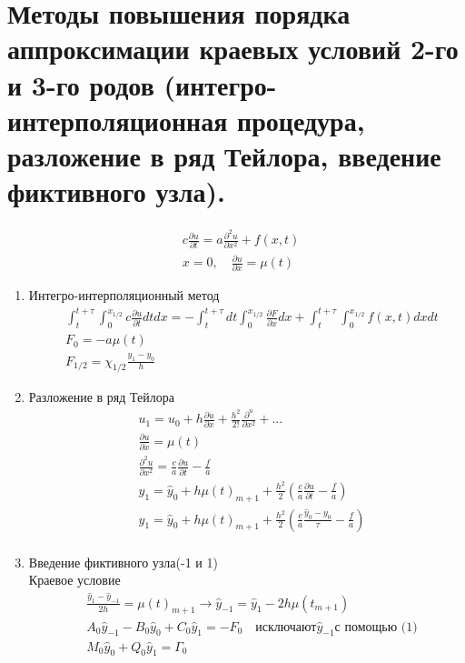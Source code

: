 \documentclass[12pt,a4paper]{article}
\begin{document}
	\section{Методы повышения порядка аппроксимации краевых условий 2-го и 3-го родов (интегро- интерполяционная процедура, разложение в ряд Тейлора, введение фиктивного узла).}	
	\begin{align*}
	&c\frac{\partial u}{\partial t} = a \frac{\partial^2 u}{\partial x^2} + f(x, t)\\
	& x = 0, \quad \frac{\partial u}{\partial x} = \mu(t) 
	\end{align*}
	\begin{enumerate}
		\item Интегро-интерполяционный метод\\
		\begin{align*}
		&\int_{t}^{t+\tau} \int_{0}^{x_{1/2}} c \frac{\partial u}{\partial t} dt dx = - \int_{t}^{t+\tau} dt \int_{0}^{x_{1/2}}\frac{\partial F}{\partial x} dx + \int_{t}^{t+\tau} \int_{0}^{x_{1/2}} f(x, t)dx dt\\
		&F_0 = -a \mu(t)\\
		& F_{1/2} = \chi_{1/2}\frac{y_1 - y_0}{h}
		\end{align*}
		\item Разложение в ряд Тейлора \\
		\begin{align*}
		&u_1 = u_0 + h\frac{\partial u}{\partial x} + \frac{h^2}{2!} \frac{\partial^ u}{\partial x^2 }+...\\
		&\frac{\partial u}{\partial x} = \mu(t)\\
		&\frac{\partial^2 u}{\partial x^2 }= \frac{c}{a}\frac{\partial u}{\partial t} - \frac{f}{a}\\
		&y_1 = \hat{y}_0 + h\mu(t)_{m+1} + \frac{h^2}{2}\left( \frac{c}{a}\frac{\partial u}{\partial t} - \frac{f}{a} \right)\\
		&y_1 = \hat{y}_0 + h\mu(t)_{m+1} + \frac{h^2}{2}\left( \frac{c}{a}\frac{ \hat{y}_0 - y_0}{\tau} - \frac{f}{a}\right)\\
		\end{align*}
		\item Введение фиктивного узла(-1 и 1)\\
		Краевое условие\\
		\begin{align*}
		&\frac{\hat{y}_1 - \hat{y}_{-1}}{2h} = \mu(t)_{m+1} \rightarrow \hat{y}_{-1} = \hat{y}_1 - 2h \mu(t_{m+1})\\
		&A_0 \hat{y}_{-1} - B_0 \hat{y}_0 + C_0 \hat{y}_1 = -F_0 \quad \text{исключают} \hat{y}_{-1} \text{с помощью (1)}\\
		&M_0 \hat{y}_0 + Q_0 \hat{y}_1 = \varGamma_0
		\end{align*}
	\end{enumerate}
\end{document}
